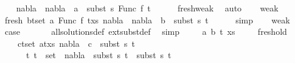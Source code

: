 \begin{isabellebody}
\ \ \isamarkupfalse%
\ {\isachardoublequoteopen}{\isacharparenleft}{\kern0pt}nabla{}\ {\isasymunion}\ nabla{}{\isacharparenright}{\kern0pt}\ {\isasymturnstile}\ a\ {\isasymsharp}\ subst\ s{}\ {\isacharparenleft}{\kern0pt}Func\ f\ t{\isacharprime}{\kern0pt}{\isacharparenright}{\kern0pt}{\isachardoublequoteclose}\isanewline
\ \ \ \ \isamarkupfalse%
\ fresh{\isacharunderscore}{\kern0pt}weak\ \isamarkupfalse%
\ auto\isanewline
\ \ \isamarkupfalse%
\ weak{}\isanewline
\ \ \isamarkupfalse%
\ fresh{\isacharcolon}{\kern0pt}\ {\isachardoublequoteopen}{\isasymforall}{\isacharparenleft}{\kern0pt}b{\isacharcomma}{\kern0pt}t{\isacharparenright}{\kern0pt}{\isasymin}set\ {\isacharparenleft}{\kern0pt}{\isacharparenleft}{\kern0pt}a{\isacharcomma}{\kern0pt}\ Func\ f\ t{\isacharprime}{\kern0pt}{\isacharparenright}{\kern0pt}{\isacharhash}{\kern0pt}xs{\isacharparenright}{\kern0pt}{\isachardot}{\kern0pt}\ {\isacharparenleft}{\kern0pt}nabla{}\ {\isasymunion}\ nabla{}{\isacharparenright}{\kern0pt}\ {\isasymturnstile}\ b\ {\isasymsharp}\ subst\ s{}\ t{\isachardoublequoteclose}\isanewline
\ \ \ \ \isamarkupfalse%
\ simp\isanewline
\ \ \isamarkupfalse%
\ weak{}{\isacharparenleft}{\kern0pt}{}{\isacharparenright}{\kern0pt}\ \isamarkupfalse%
\ {\isacharquery}{\kern0pt}case\ \isanewline
\ \ \ \ \isamarkupfalse%
\ all{\isacharunderscore}{\kern0pt}solutions{\isacharunderscore}{\kern0pt}def\ ext{\isacharunderscore}{\kern0pt}subst{\isacharunderscore}{\kern0pt}def\ \isamarkupfalse%
\ simp\isanewline
{}\isamarkupfalse%
\isanewline
\ \ \isamarkupfalse%
\ {\isacharparenleft}{\kern0pt}{}\ a\ b\ t{\isacharprime}{\kern0pt}\ xs{\isacharparenright}{\kern0pt}\isanewline
\ \ \ \isamarkupfalse%
\ fresh{\isacharunderscore}{\kern0pt}old{\isacharcolon}{\kern0pt}\isanewline
\ \ \ \ {\isachardoublequoteopen}{\isasymforall}{\isacharparenleft}{\kern0pt}c{\isacharcomma}{\kern0pt}t{\isacharparenright}{\kern0pt}{\isasymin}set\ {\isacharparenleft}{\kern0pt}{\isacharparenleft}{\kern0pt}a{\isacharcomma}{\kern0pt}t{\isacharprime}{\kern0pt}{\isacharparenright}{\kern0pt}{\isacharhash}{\kern0pt}xs{\isacharparenright}{\kern0pt}{\isachardot}{\kern0pt}\ nabla{}\ {\isasymturnstile}\ c\ {\isasymsharp}\ subst\ s{}\ t{\isachardoublequoteclose}\isanewline
\ \ \ \ \ {\isachardoublequoteopen}{\isasymforall}\ {\isacharparenleft}{\kern0pt}t{}{\isacharcomma}{\kern0pt}\ t{}{\isacharparenright}{\kern0pt}\ {\isasymin}\ set\ {\isacharbrackleft}{\kern0pt}{\isacharbrackright}{\kern0pt}{\isachardot}{\kern0pt}\ nabla{}\ {\isasymturnstile}\ subst\ s{}\ t{}\ {\isasymapprox}\ subst\ s{}\ t{}{\isachardoublequoteclose}\isanewline

\end{isabellebody}
